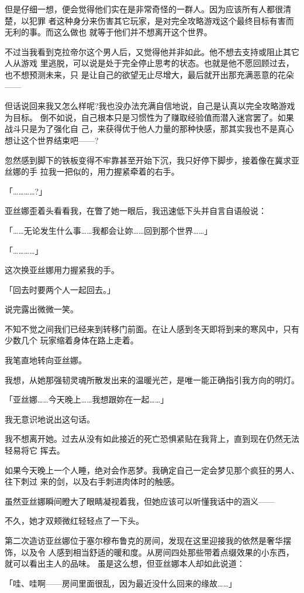 \documentclass[11pt]{book}
\begin{document}
但是仔细一想，便会觉得他们实在是非常奇怪的一群人。因为应该所有人都很清楚，以犯罪
者这种身分来伤害其它玩家，是对完全攻略游戏这个最终目标有害而无利的事。而这么做也
就等于他们并不想离开这个世界。

不过当我看到克拉帝尔这个男人后，又觉得他并非如此。他不想去支持或阻止其它人从游戏
里逃脱，可以说是处于完全停止思考的状态。也就是他不愿回顾过去，也不想预测未来，只
是让自己的欲望无止尽增大，最后就开出那充满恶意的花朵——

但话说回来我又怎么样呢?我也没办法充满自信地说，自己是认真以完全攻略游戏为目标。
倒不如说，自己根本只是习惯性为了赚取经验值而潜入迷宫罢了。如果战斗只是为了强化自
己，来获得优于他人力量的那种快感，那其实我也不是真心想让这个世界结束吧——?

忽然感到脚下的铁板变得不牢靠甚至开始下沉，我只好停下脚步，接着像在冀求亚丝娜的手
拉我一把似的，用力握紧牵着的右手。

「…………?」

亚丝娜歪着头看看我，在瞥了她一眼后，我迅速低下头并自言自语般说：

「……无论发生什么事……我都会让妳……回到那个世界……」

「…………」

这次换亚丝娜用力握紧我的手。

「回去时要两个人一起回去。」

说完露出微微一笑。

不知不觉之间我们已经来到转移门前面。在让人感到冬天即将到来的寒风中，只有少数几个
玩家缩着身体在路上走着。

我笔直地转向亚丝娜。

我想，从她那强韧灵魂所散发出来的温暖光芒，是唯一能正确指引我方向的明灯。

「亚丝娜……今天晚上……我想跟妳在一起……」

我无意识地说出这句话。

我不想离开她。过去从没有如此接近的死亡恐惧紧贴在我背上，直到现在仍然无法轻易将它
挥去。

如果今天晚上一个人睡，绝对会作恶梦。我确定自己一定会梦见那个疯狂的男人、往下刺过
来的剑，以及右手刺进肉体时的触感。

虽然亚丝娜瞬间瞪大了眼睛凝视着我，但她应该可以听懂我话中的涵义——

不久，她才双颊微红轻轻点了一下头。

第二次造访亚丝娜位于塞尔穆布鲁克的房间，发现在这里迎接我的依然是奢华摆饰，以及令
人感到相当舒适的暖和度。从房间四处那些带着点缀效果的小东西，就可以看出主人的品味。
虽是这么想，但亚丝娜本人却如此说道：

「哇、哇啊——房间里面很乱，因为最近没什么回来的缘故……」
\end{document}
